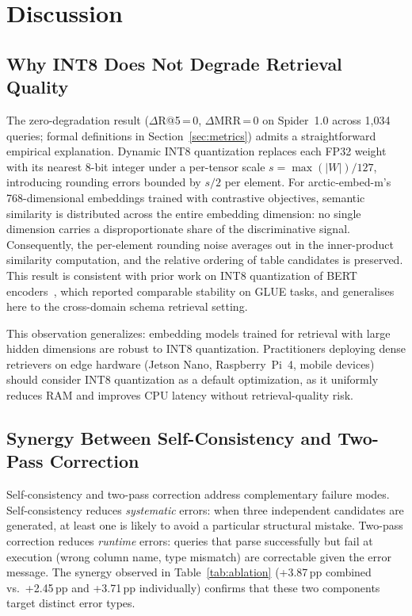 \section{Discussion}
\label{sec:discussion}

\subsection{Why INT8 Does Not Degrade Retrieval Quality}
\label{sec:rkdef}

The zero-degradation result ($\Delta$R@5\,=\,0, $\Delta$MRR\,=\,0 on
Spider~1.0 across 1{,}034 queries; formal definitions in
Section~\ref{sec:metrics}) admits a straightforward empirical explanation.
Dynamic INT8 quantization replaces each FP32 weight with its nearest
8-bit integer under a per-tensor scale $s = \max(|W|)/127$, introducing
rounding errors bounded by $s/2$ per element.
For arctic-embed-m's 768-dimensional embeddings trained with contrastive
objectives, semantic similarity is distributed across the entire embedding
dimension: no single dimension carries a disproportionate share of the
discriminative signal.
Consequently, the per-element rounding noise averages out in the
inner-product similarity computation, and the relative ordering of
table candidates is preserved.
This result is consistent with prior work on INT8 quantization of BERT
encoders~\citep{zafrir2019q8bert}, which reported comparable stability on
GLUE tasks, and generalises here to the cross-domain schema retrieval
setting.

This observation generalizes: embedding models trained for retrieval
with large hidden dimensions are robust to INT8 quantization.
Practitioners deploying dense retrievers on edge hardware
(Jetson Nano, Raspberry~Pi~4, mobile devices) should consider INT8
quantization as a default optimization, as it uniformly reduces RAM
and improves CPU latency without retrieval-quality risk.

\subsection{Synergy Between Self-Consistency and Two-Pass Correction}

Self-consistency and two-pass correction address complementary failure
modes.
Self-consistency reduces \textit{systematic} errors: when three
independent candidates are generated, at least one is likely to avoid
a particular structural mistake.
Two-pass correction reduces \textit{runtime} errors: queries that parse
successfully but fail at execution (wrong column name, type mismatch)
are correctable given the error message.
The synergy observed in Table~\ref{tab:ablation} (+3.87\,pp combined
vs.\ +2.45\,pp and +3.71\,pp individually) confirms that these
two components target distinct error types.

